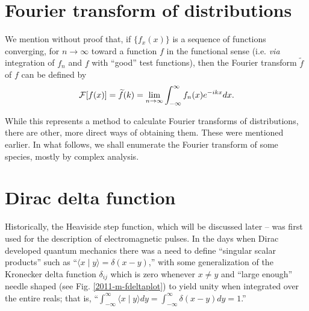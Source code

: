 \section{Fourier transform  of distributions}
\label{2012-m-ch-di-ftgeneraldefcon}

We mention without proof that, if $\{ f_x(x)\}$ is a sequence of functions converging, for $n\rightarrow \infty$
toward a function $f$ in the functional sense (i.e. {\it via}
integration of $f_n$ and $f$ with ``good'' test functions),
then the Fourier transform $\widetilde f$ of $f$ can be defined by \cite{Lighthill,Howell,doi:10.1080/0020739900210418}
\begin{equation}
\begin{split}
 {\cal F}[f(x)]=\widetilde{f}(k)= \lim_{n\rightarrow \infty}
 \int_{-\infty}^\infty  f_n(x) e^{-i{kx}} dx
.
\end{split}
\end{equation}

While this represents a method to calculate  Fourier transforms of distributions, there are other, more direct ways of
obtaining them.
These were mentioned earlier.
In what follows, we shall enumerate the Fourier transform of some species, mostly by complex analysis.




\section{Dirac  delta function}




Historically, the Heaviside step function, which will be discussed later --
was first used for the description of electromagnetic pulses.
In the days when Dirac developed quantum mechanics  there was a need to define
``singular scalar products'' such as ``$\langle x \mid y \rangle = \delta (x-y)$,''
with some generalization of the Kronecker delta function $\delta_{ij}$
which is zero whenever $x\neq y$ and ``large enough'' needle shaped (see Fig. \ref{2011-m-fdeltaplot}) to yield unity when
integrated over the entire reals; that is, ``$\int_{-\infty}^\infty \langle x \mid y \rangle dy =\int_{-\infty}^\infty \delta (x-y) dy =1$.''

